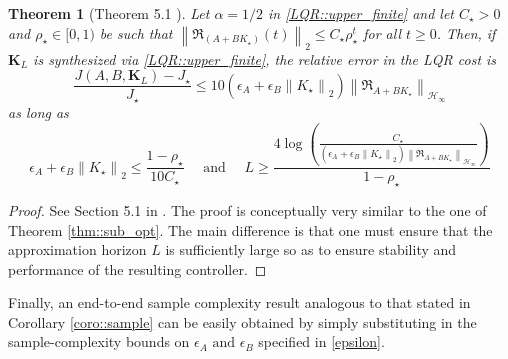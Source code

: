 \documentclass{article}[12pt]
\newtheorem{theorem}{Theorem}
\begin{document}
\begin{theorem}[Theorem 5.1 \cite{dean2017sample}]
Let $\alpha=1 / 2$ in \eqref{LQR::upper_finite} and let $C_{\star}>0$ and $ \rho_{\star} \in[0,1)$ be such that $\left\|\mathfrak{R}_{\left(A+B K_{\star}\right)}(t)\right\|_{2} \leq C_{\star} \rho_{\star}^{t}$ for all $t \geq 0$.
Then, if $\mathbf{K}_L$ is synthesized via \eqref{LQR::upper_finite}, the relative error in the LQR cost is
\begin{equation}
    \frac{J\left(A, B, \mathbf{K}_{L}\right)-J_{\star}}{J_{\star}} \leq 10\left(\epsilon_{A}+\epsilon_{B}\left\|K_{\star}\right\|_{2}\right)\left\|\mathfrak{R}_{A+B K_{\star}}\right\|_{ \mathcal{H}_{\infty}}
\end{equation}
as long as
\begin{equation}
    \epsilon_{A}+\epsilon_{B}\left\|K_{\star}\right\|_{2} \leq \frac{1-\rho_{\star}}{10 C_{\star}} \quad \text { and } \quad L \geq \frac{4 \log \left(\frac{C_{\star}}{\left(\epsilon_{A}+\epsilon_{B}\left\|K_{\star}\right\|_{2}\right)\left\|\Re_{A+B K_{\star}}\right\|_{ \mathcal{H}_{\infty}}}\right)}{1-\rho_{\star}}
\end{equation}
\end{theorem}
\begin{proof}
See Section 5.1 in \cite{dean2017sample}. The proof is conceptually very similar to the one of Theorem \ref{thm::sub_opt}. 
The main difference is that one must ensure that the approximation horizon $L$ is sufficiently large so as to ensure stability and performance of the resulting controller.
\end{proof}
\noindent
Finally, an end-to-end sample complexity result analogous to that stated in Corollary \ref{coro::sample} can be easily obtained by simply substituting in the sample-complexity bounds on $\epsilon_{A} \text { and } \epsilon_{B}$ specified in \eqref{epsilon}.





%
 
\end{document}
